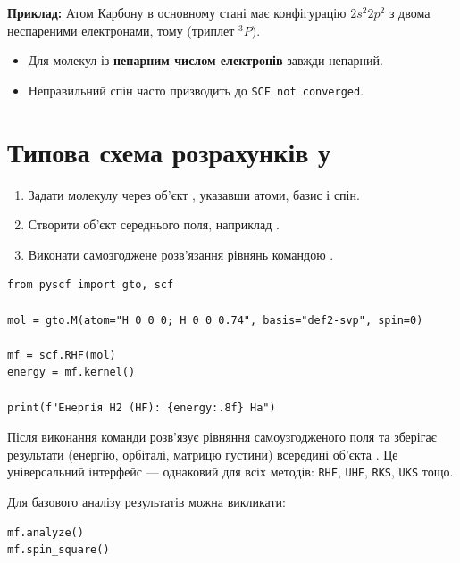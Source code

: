 \textbf{Приклад:} Атом Карбону в основному стані має конфігурацію $2s^2 2p^2$
з двома неспареними електронами, тому  (триплет $^3P$).

\begin{commentbox}
	\begin{itemize}
		\item Для молекул із \textbf{непарним числом електронів} 
		      завжди непарний.
		\item Неправильний спін часто призводить до \texttt{SCF not converged}.
	\end{itemize}
\end{commentbox}

\section{Типова схема розрахунків у \PySCF}

\begin{enumerate}
	\item Задати молекулу через об’єкт , указавши атоми, базис і спін.
	\item Створити об’єкт середнього поля, наприклад .
	\item Виконати самозгоджене розв’язання рівнянь командою .
\end{enumerate}

\begin{verbatim}
from pyscf import gto, scf

mol = gto.M(atom="H 0 0 0; H 0 0 0.74", basis="def2-svp", spin=0)

mf = scf.RHF(mol)
energy = mf.kernel()

print(f"Енергія H2 (HF): {energy:.8f} Ha")
\end{verbatim}

Після виконання команди  \PySCF{} розв’язує рівняння самоузгодженого поля
та зберігає результати (енергію, орбіталі, матрицю густини) всередині об’єкта .
Це універсальний інтерфейс --- однаковий для всіх методів: \texttt{RHF}, \texttt{UHF}, \texttt{RKS}, \texttt{UKS} тощо.

Для базового аналізу результатів можна викликати:

\begin{verbatim}
mf.analyze()
mf.spin_square()
\end{verbatim}


